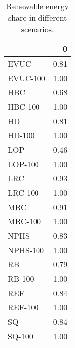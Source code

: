 \begin{table}
\centering
\caption{Renewable energy share in different scenarios.}
\label{tab:re_share}
\begin{tabular}{lr}
\toprule
{} &    0 \\
\midrule
EVUC     & 0.81 \\
EVUC-100 & 1.00 \\
HBC      & 0.68 \\
HBC-100  & 1.00 \\
HD       & 0.81 \\
HD-100   & 1.00 \\
LOP      & 0.46 \\
LOP-100  & 1.00 \\
LRC      & 0.93 \\
LRC-100  & 1.00 \\
MRC      & 0.91 \\
MRC-100  & 1.00 \\
NPHS     & 0.83 \\
NPHS-100 & 1.00 \\
RB       & 0.79 \\
RB-100   & 1.00 \\
REF      & 0.84 \\
REF-100  & 1.00 \\
SQ       & 0.84 \\
SQ-100   & 1.00 \\
\bottomrule
\end{tabular}
\end{table}

